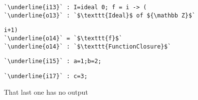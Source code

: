 \documentclass[12pt,a4paper]{amsart}
\begin{document}
\smallskip
\begin{lstlisting}[language=Macaulay2]
`\underline{i13}` : I=ideal 0; f = i -> (
`\underline{o13}` : `$\texttt{Ideal}$ of ${\mathbb Z}$`
\end{lstlisting}
\begin{lstlisting}[language=Macaulay2]
   i+1)
`\underline{o14}` = `$\texttt{f}$`
`\underline{o14}` : `$\texttt{FunctionClosure}$`
\end{lstlisting}
\smallskip


\smallskip
\begin{lstlisting}[language=Macaulay2]
`\underline{i15}` : a=1;b=2;
\end{lstlisting}
\begin{lstlisting}[language=Macaulay2]
`\underline{i17}` : c=3;
\end{lstlisting}
\smallskip

That last one has no output
\end{document}
